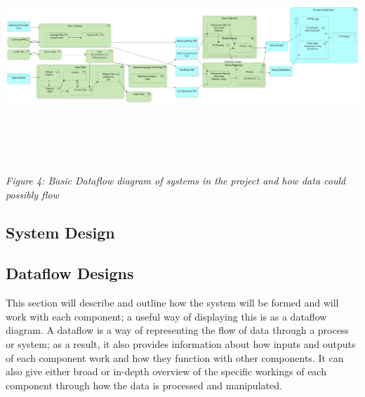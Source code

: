 \documentclass[oneside, 12pt]{article}
\begin{document}
		\includegraphics[width=18cm,height=8cm]{images/Generic_Flow.png}
		\begin{center}
			\textit{Figure 4: Basic Dataflow diagram of systems in the project and how data could possibly flow}
		\end{center}
		
	\newpage
	
	\begin{center}	
		\section{System Design}\label{Design}
	\end{center}
		\subsection{Dataflow Designs}
		This section will describe and outline how the system will be formed and will work with each component; a useful way of displaying this is as a dataflow diagram. A dataflow is a way of representing the flow of data through a process or system; as a result, it also provides information about how inputs and outputs of each component work and how they function with other components. It can also give either broad or in-depth overview of the specific workings of each component through how the data is processed and manipulated.
		\newline
		
\end{document}
